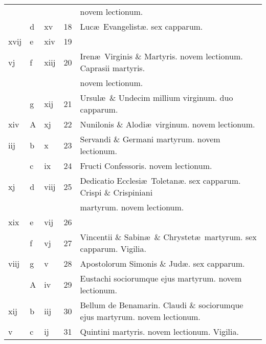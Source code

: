 \documentclass[letter,11pt]{book}
\begin{document}
\begin{center}
\begin{tabular}{l | l | l | r | l}
 &  &  &  & \quad \color{Red} novem lectionum. \\
\color{Red}  & d & \color{Red} xv & 18 & \color{Red} Luc\ae \ Evangelist\ae . \color{black} sex capparum. \\
\color{Red} xvij & e & \color{Red} xiv & 19 & \\
\color{Red} vj & f & \color{Red} xiij & 20 & Iren\ae \ Virginis \& Martyris. \color{Red} novem lectionum. \color{black} Caprasii martyris. \\
 &  &  &  & \quad \color{Red} novem lectionum. \\
\color{Red}  & g & \color{Red} xij & 21 & Ursul\ae \ \& Undecim millium virginum. \color{Red} duo capparum. \\
\color{Red} xiv & \color{Red} A & \color{Red} xj & 22 & Nunilonis \& Alodi\ae \ virginum. \color{Red} novem lectionum. \\
\color{Red} iij & b & \color{Red} x & 23 & Servandi \& Germani martyrum. \color{Red} novem lectionum. \\
\color{Red}  & c & \color{Red} ix & 24 & Fructi Confessoris. \color{Red} novem lectionum. \\
\color{Red} xj & d & \color{Red} viij & 25 & Dedicatio Ecclesi\ae \ Toletan\ae . \color{Red} sex capparum. \color{black} Crispi \& Crispiniani \\
 &  &  &  & \quad martyrum. \color{Red} novem lectionum. \\
\color{Red} xix & e & \color{Red} vij & 26 & \\
\color{Red}  & f & \color{Red} vj & 27 & Vincentii \& Sabin\ae \ \& Chrystet\ae \ martyrum. \color{Red} sex capparum. \color{black} Vigilia. \\
\color{Red} viij & g & \color{Red} v & 28 & \color{Red} Apostolorum Simonis \& Jud\ae . \color{black} sex capparum. \\
\color{Red}  & \color{Red} A & \color{Red} iv & 29 & Eustachi sociorumque ejus martyrum. \color{Red} novem lectionum. \\
\color{Red} xij & b & \color{Red} iij & 30 & Bellum de Benamarin. \quad Claudi \& sociorumque ejus martyrum. \color{Red} novem lectionum. \\
\color{Red} v & c & \color{Red} ij & 31 & Quintini martyris. \color{Red} novem lectionum. \color{black} Vigilia. \\%
\end{tabular}
\end{center}
\end{document}
